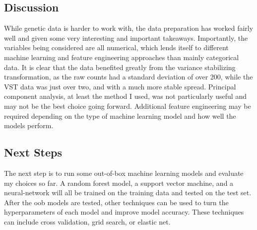 \documentclass[
]{article}
\begin{document}
\subsection{Discussion}\label{discussion}

While genetic data is harder to work with, the data preparation has
worked fairly well and given some very interesting and important
takeaways. Importantly, the variables being considered are all
numerical, which lends itself to different machine learning and feature
engineering approaches than mainly categorical data. It is clear that
the data benefited greatly from the variance stabilizing transformation,
as the raw counts had a standard deviation of over 200, while the VST
data was just over two, and with a much more stable spread. Principal
component analysis, at least the method I used, was not particularly
useful and may not be the best choice going forward. Additional feature
engineering may be required depending on the type of machine learning
model and how well the models perform.

\subsection{Next Steps}\label{next-steps}

The next step is to run some out-of-box machine learning models and
evaluate my choices so far. A random forest model, a support vector
machine, and a neural-network will all be trained on the training data
and tested on the test set. After the oob models are tested, other
techniques can be used to turn the hyperparameters of each model and
improve model accuracy. These techniques can include cross validation,
grid search, or elastic net.
\end{document}
